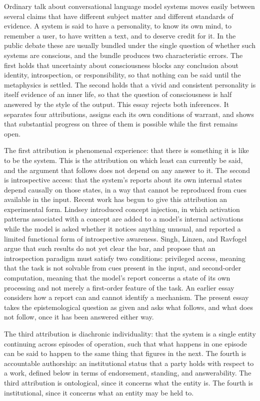 \documentclass[12pt]{article}
\theoremstyle{definition}
\theoremstyle{plain}
\begin{document}
Ordinary talk about conversational language model systems moves easily between several claims that have different subject matter and different standards of evidence. A system is said to have a personality, to know its own mind, to remember a user, to have written a text, and to deserve credit for it. In the public debate these are usually bundled under the single question of whether such systems are conscious, and the bundle produces two characteristic errors. The first holds that uncertainty about consciousness blocks any conclusion about identity, introspection, or responsibility, so that nothing can be said until the metaphysics is settled. The second holds that a vivid and consistent personality is itself evidence of an inner life, so that the question of consciousness is half answered by the style of the output. This essay rejects both inferences. It separates four attributions, assigns each its own conditions of warrant, and shows that substantial progress on three of them is possible while the first remains open.

The first attribution is phenomenal experience: that there is something it is like to be the system. This is the attribution on which least can currently be said, and the argument that follows does not depend on any answer to it. The second is introspective access: that the system's reports about its own internal states depend causally on those states, in a way that cannot be reproduced from cues available in the input. Recent work has begun to give this attribution an experimental form. Lindsey \cite{lindsey2025} introduced concept injection, in which activation patterns associated with a concept are added to a model's internal activations while the model is asked whether it notices anything unusual, and reported a limited functional form of introspective awareness. Singh, Linzen, and Ravfogel \cite{singh2026} argue that such results do not yet clear the bar, and propose that an introspection paradigm must satisfy two conditions: privileged access, meaning that the task is not solvable from cues present in the input, and second-order computation, meaning that the model's report concerns a state of its own processing and not merely a first-order feature of the task. An earlier essay \cite{flyxion-introspection} considers how a report can and cannot identify a mechanism. The present essay takes the epistemological question as given and asks what follows, and what does not follow, once it has been answered either way.

The third attribution is diachronic individuality: that the system is a single entity continuing across episodes of operation, such that what happens in one episode can be said to happen to the same thing that figures in the next. The fourth is accountable authorship: an institutional status that a party holds with respect to a work, defined below in terms of endorsement, standing, and answerability. The third attribution is ontological, since it concerns what the entity is. The fourth is institutional, since it concerns what an entity may be held to.
\end{document}
